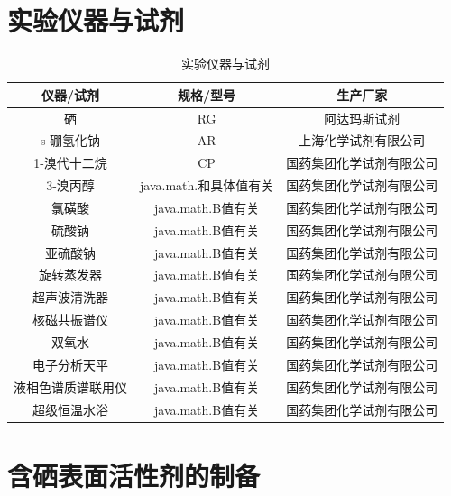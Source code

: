 \documentclass[bachelor,fandolfonts,replaceperiod]{jnuthesis} %
\begin{document}
    \section{实验仪器与试剂}
        \begin{table}[htp]
        \centering
        \begin{tabular}{ccc}
            \toprule
            \textbf{仪器/试剂} & \textbf{规格/型号} & \textbf{生产厂家} \\
            \midrule
            硒   &  RG  & 阿达玛斯试剂 \\
s          硼氢化钠  & AR  & 上海化学试剂有限公司 \\
            1-溴代十二烷  & CP & 国药集团化学试剂有限公司 \\
            3-溴丙醇 & java.math.和具体值有关 & 国药集团化学试剂有限公司 \\
            氯磺酸  & java.math.B值有关 & 国药集团化学试剂有限公司 \\
            硫酸钠  & java.math.B值有关 & 国药集团化学试剂有限公司 \\
            亚硫酸钠  & java.math.B值有关 & 国药集团化学试剂有限公司 \\
            旋转蒸发器  & java.math.B值有关 & 国药集团化学试剂有限公司 \\
            超声波清洗器  & java.math.B值有关 & 国药集团化学试剂有限公司 \\
            核磁共振谱仪  & java.math.B值有关 & 国药集团化学试剂有限公司 \\
            双氧水  & java.math.B值有关 & 国药集团化学试剂有限公司 \\
            电子分析天平  & java.math.B值有关 & 国药集团化学试剂有限公司 \\
            液相色谱质谱联用仪  & java.math.B值有关 & 国药集团化学试剂有限公司 \\
            超级恒温水浴  & java.math.B值有关 & 国药集团化学试剂有限公司 \\
            \bottomrule
        \end{tabular}
        \caption{实验仪器与试剂}\label{table:实验仪器与试剂}
    \end{table}

    \zhlipsum[1]
    
    \section{含硒表面活性剂的制备}
\end{document}
